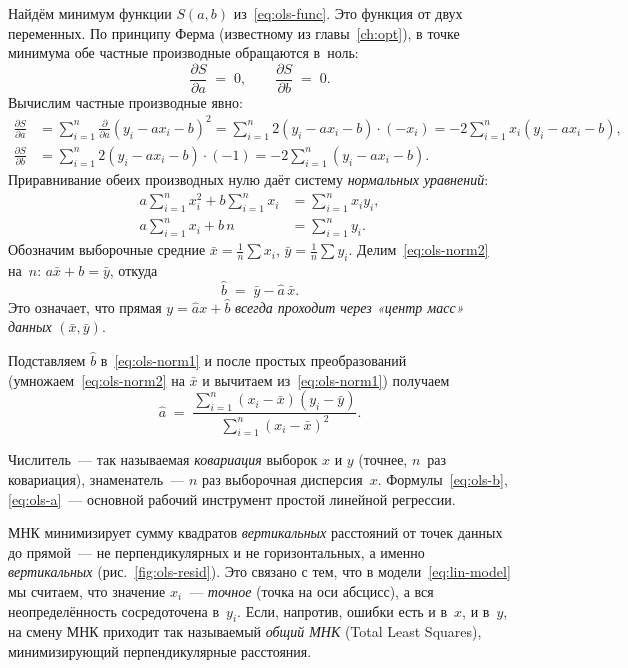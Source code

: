 Найдём минимум функции $S(a,b)$ из~\eqref{eq:ols-func}. Это функция от
двух переменных. По принципу Ферма (известному из главы~\ref{ch:opt}),
в точке минимума обе частные производные обращаются в~ноль:
\begin{equation}\label{eq:ols-grad}
\frac{\partial S}{\partial a}\;=\;0,\qquad
\frac{\partial S}{\partial b}\;=\;0.
\end{equation}
Вычислим частные производные явно:
\begin{align*}
\frac{\partial S}{\partial a}
 &=\sum_{i=1}^{n}\frac{\partial}{\partial a}(y_i-a x_i-b)^{2}
  =\sum_{i=1}^{n}2(y_i-a x_i-b)\cdot(-x_i)
  =-2\sum_{i=1}^{n}x_i(y_i-a x_i-b),\\[2pt]
\frac{\partial S}{\partial b}
 &=\sum_{i=1}^{n}2(y_i-a x_i-b)\cdot(-1)
  =-2\sum_{i=1}^{n}(y_i-a x_i-b).
\end{align*}
Приравнивание обеих производных нулю даёт систему \emph{нормальных
уравнений}:
\begin{align}
a\sum_{i=1}^{n}x_i^{2}+b\sum_{i=1}^{n}x_i
   &=\sum_{i=1}^{n}x_i y_i,\label{eq:ols-norm1}\\
a\sum_{i=1}^{n}x_i+b\,n
   &=\sum_{i=1}^{n}y_i.\label{eq:ols-norm2}
\end{align}
Обозначим выборочные средние $\bar x=\frac{1}{n}\sum x_i$,
$\bar y=\frac{1}{n}\sum y_i$. Делим~\eqref{eq:ols-norm2} на~$n$:
$a\bar x+b=\bar y$, откуда
\begin{equation}\label{eq:ols-b}
\boxed{\;\hat b\;=\;\bar y-\hat a\,\bar x.\;}
\end{equation}
Это означает, что прямая $y=\hat a x+\hat b$ \emph{всегда проходит
через «центр масс» данных} $(\bar x,\bar y)$.

Подставляем $\hat b$ в~\eqref{eq:ols-norm1} и после простых
преобразований (умножаем~\eqref{eq:ols-norm2} на $\bar x$ и
вычитаем из~\eqref{eq:ols-norm1}) получаем
\begin{equation}\label{eq:ols-a}
\boxed{\;\hat a\;=\;\dfrac{\sum_{i=1}^{n}(x_i-\bar x)(y_i-\bar y)}{\sum_{i=1}^{n}(x_i-\bar x)^{2}}.\;}
\end{equation}

Числитель~--- так называемая \emph{ковариация} выборок $x$ и $y$
(точнее, $n$~раз ковариация), знаменатель~--- $n$ раз выборочная
дисперсия~$x$. Формулы~\eqref{eq:ols-b}, \eqref{eq:ols-a}~--- основной
рабочий инструмент простой линейной регрессии.

\begin{notebox}[title={Геометрический смысл}]
МНК минимизирует сумму квадратов \emph{вертикальных} расстояний от
точек данных до прямой~--- не перпендикулярных и не горизонтальных, а
именно \emph{вертикальных} (рис.~\ref{fig:ols-resid}). Это связано с
тем, что в модели~\eqref{eq:lin-model} мы считаем, что значение
$x_i$~--- \emph{точное} (точка на оси абсцисс), а вся неопределённость
сосредоточена в~$y_i$. Если, напротив, ошибки есть и в~$x$, и в~$y$, на
смену МНК приходит так называемый \emph{общий МНК} (Total Least
Squares), минимизирующий перпендикулярные расстояния.
\end{notebox}

